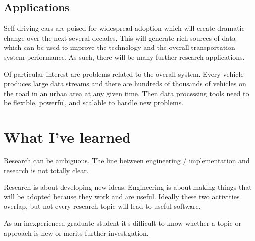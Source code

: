 \documentclass[12pt]{article}
\begin{document}
\subsection{Applications}

Self driving cars are poised for widespread adoption which will create
dramatic change over the next several decades. This will generate rich
sources of data which can be used to improve the technology and the overall
transportation system performance.\cite{swan2015connected}
As such, there will be many further research applications.

Of particular interest are problems related to the overall system. Every
vehicle produces large data streams and there are hundreds of
thousands of vehicles on the road in an urban area at any given time.
Then data processing tools need to be flexible, powerful, and scalable to
handle new problems.

\section{What I've learned}

Research can be ambiguous. The line between engineering / implementation
and research is not totally clear.

Research is about developing new ideas. Engineering is about making
things that will be adopted because they work and are useful. Ideally these
two activities overlap, but not every research topic will lead to useful
software.

As an inexperienced graduate student it's difficult to know whether a topic
or approach is new or merits further investigation.


 
\end{document}
